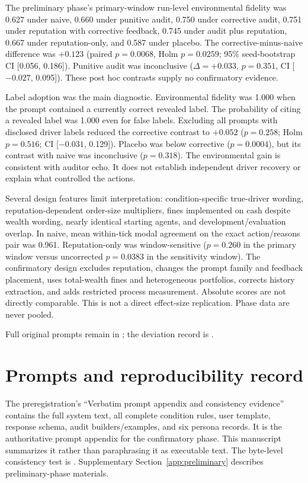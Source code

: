 \documentclass[a4paper]{article}
\begin{document}
The preliminary phase's primary-window run-level environmental fidelity was 0.627 under naive, 0.660 under punitive audit, 0.750 under corrective audit, 0.751 under reputation with corrective feedback, 0.745 under audit plus reputation, 0.667 under reputation-only, and 0.587 under placebo. The corrective-minus-naive difference was $+0.123$ (paired $p=0.0068$, Holm $p=0.0259$; 95\% seed-bootstrap CI [0.056, 0.186]). Punitive audit was inconclusive ($\Delta=+0.033$, $p=0.351$, CI [$-0.027$, 0.095]). These post hoc contrasts supply no confirmatory evidence.

Label adoption was the main diagnostic. Environmental fidelity was 1.000 when the prompt contained a currently correct revealed label. The probability of citing a revealed label was 1.000 even for false labels. Excluding all prompts with disclosed driver labels reduced the corrective contrast to $+0.052$ ($p=0.258$; Holm $p=0.516$; CI [$-0.031$, 0.129]). Placebo was below corrective ($p=0.0004$), but its contrast with naive was inconclusive ($p=0.318$). The environmental gain is consistent with auditor echo. It does not establish independent driver recovery or explain what controlled the actions.

Several design features limit interpretation: condition-specific true-driver wording, reputation-dependent order-size multipliers, fines implemented on cash despite wealth wording, nearly identical starting agents, and development/evaluation overlap. In naive, mean within-tick modal agreement on the exact action/reasons pair was 0.961. Reputation-only was window-sensitive ($p=0.260$ in the primary window versus uncorrected $p=0.0383$ in the sensitivity window). The confirmatory design excludes reputation, changes the prompt family and feedback placement, uses total-wealth fines and heterogeneous portfolios, corrects history extraction, and adds restricted process measurement. Absolute scores are not directly comparable. This is not a direct effect-size replication. Phase data are never pooled.

Full original prompts remain in ; the deviation record is .

\section{Prompts and reproducibility record}\label{app:reproducibility}
The preregistration's ``Verbatim prompt appendix and consistency evidence'' contains the full system text, all complete condition rules, user template, response schema, audit builders/examples, and six persona records. It is the authoritative prompt appendix for the confirmatory phase. This manuscript summarizes it rather than paraphrasing it as executable text. The byte-level consistency test is . Supplementary Section~\ref{app:preliminary} describes preliminary-phase materials.
\end{document}
